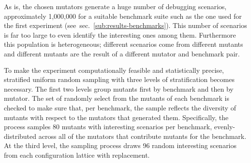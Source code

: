 

As is, the chosen mutators generate a huge number of debugging scenarios,
approximately 1,000,000 for a suitable benchmark suite such as the one used for
the first experiment (see~sec.~\ref{sub:results-benchmarks}). This number of
scenarios is far too large to even identify the interesting ones among them.
Furthermore this population is heterogeneous; different scenarios come from
different mutants and different mutants are the result of a different mutator
and benchmark pair.

To make the experiment computationally feasible and statistically precise,
stratified uniform random sampling with three levels of stratification becomes
necessary.  The first two levels group mutants first by benchmark and then by
mutator.  The set of randomly select from the mutants of each benchmark is
checked to make sure that, per benchmark, the sample reflects the diversity of
mutants with respect to the mutators that generated them.  Specifically, the
process samples 80 mutants with interesting scenarios per benchmark,
evenly-distributed across all of the mutators that contribute mutants for the
benchmark.  At the third level, the sampling process draws 96 random interesting
scenarios from each configuration lattice with replacement. 


 



